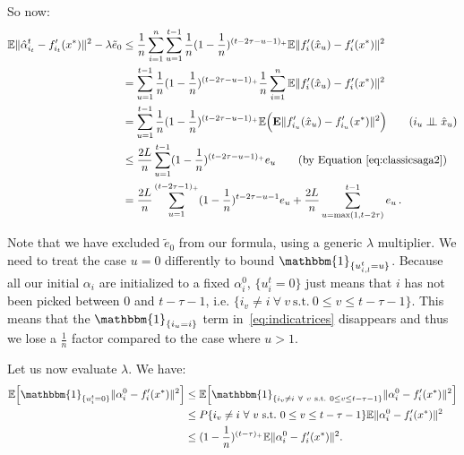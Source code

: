 \documentclass[twoside]{article}
\newcommand{\overlap}{\tau}
\newcommand{\lipschitz}{L}
\newcommand{\E}{\mathbb{E}}
\newcommand{\Econd}{\mathbf{E}}
\newcommand{\ind}{\mathbbm{1}}
\begin{document}
So now:
\begin{align}
\E \|\hat \alpha_{i_t}^t - f'_{i_t}(x^*)\|^2 - \lambda \tilde e_0
&\leq \frac{1}{n}\sum_{i=1}^n \sum_{u=1}^{t-1} \frac{1}{n}(1 - \frac{1}{n})^{(t-2\overlap-u-1)_+} \E \|f'_i(\hat x_{u}) - f'_i(x^*)\|^2 
\nonumber \\ 
&= \sum_{u=1}^{t-1} \frac{1}{n}(1 - \frac{1}{n})^{(t-2\overlap-u -1)_+} \frac{1}{n}\sum_{i=1}^n \E \|f'_i(\hat x_{u}) - f'_i(x^*)\|^2
\nonumber \\ 
&= \sum_{u=1}^{t-1} \frac{1}{n}(1 - \frac{1}{n})^{(t-2\overlap-u -1)_+} \E \Big(\Econd \|f'_{i_u}(\hat x_{u}) - f'_{i_u}(x^*)\|^2 \Big)
\tag*{($i_u \perp\!\!\!\perp \hat x_u$)} \nonumber \\ 
&\leq \frac{2\lipschitz}{n} \sum_{u=1}^{t-1} (1 - \frac{1}{n})^{(t-2\overlap-u -1)_+} e_u
\tag*{(by Equation~\eqref{eq:classicsaga2})} \nonumber \\ 
&= \frac{2\lipschitz}{n} \sum_{u=1}^{(t-2\overlap -1)_+} (1 - \frac{1}{n})^{t-2\overlap-u -1} e_u 
	+ \frac{2\lipschitz}{n} \sum_{u=\max(1, t-2\overlap)}^{t-1} e_u  \, .\label{eq:51}
\end{align}

Note that we have excluded $\tilde e_0$ from our formula, using a generic $\lambda$ multiplier. 
We need to treat the case $u=0$ differently to bound $\ind_{\{u_{i,l}^t = u\}}$.
Because all our initial $\alpha_i$ are initialized to a fixed $\alpha_i^0$, $\{u_i^t = 0\}$ just means that $i$ has not been picked between $0$ and $t-\overlap -1$, i.e. $\{i_v \neq i\ \forall\ v\ \text{s.t.}\ 0 \leq v \leq t - \overlap -1\}$. 
This means that the $\ind_{\{i_u=i\}}$ term in~\eqref{eq:indicatrices} disappears and thus we lose a $\frac{1}{n}$ factor compared to the case where $u>1$.

Let us now evaluate $\lambda$.
We have:
\begin{align}\label{eq:52}
\E \Big[\ind_{\{u_i^t = 0\}} \|\alpha_i^0-f'_i(x^*)\|^2 \Big]
&\leq \E \Big[\ind_{\{i_v \neq i\ \forall\ v\ \text{s.t.}\ 0 \leq v \leq t - \overlap -1\}} \|\alpha_i^0-f'_i(x^*)\|^2 \Big]
\nonumber \\ 
&\leq P\{i_v \neq i\ \forall\ v\ \text{s.t.}\ 0 \leq v \leq t - \overlap -1\} \E \|\alpha_i^0-f'_i(x^*)\|^2
\nonumber \\ 
&\leq (1 - \frac{1}{n})^{(t-\overlap)_+} \E \|\alpha_i^0-f'_i(x^*)\|^2 .
\end{align}
\end{document}
